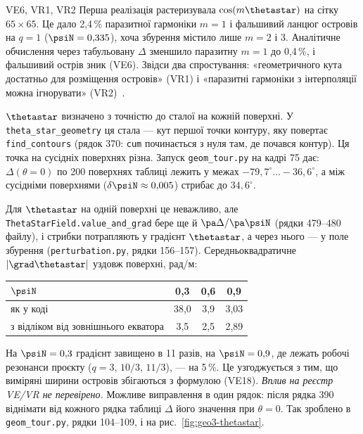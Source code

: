 \begin{established}{VE6, VR1, VR2}
Перша реалізація растеризувала $\cos(m\thetastar)$ на сітку $65\times65$. Це дало 2,4\,\% паразитної гармоніки $m=1$ і фальшивий ланцюг островів на $q=1$ ($\psiN=0{,}335$), хоча збурення містило лише $m=2$ і $3$. Аналітичне обчислення через табульовану $\Delta$ зменшило паразитну $m=1$ до 0,4\,\%, і фальшивий острів зник (VE6). Звідси два спростування: «геометричного кута достатньо для розміщення островів» (VR1) і «паразитні гармоніки з інтерполяції можна ігнорувати» (VR2)~\cite{RegViz}.
\end{established}

\begin{newfinding}
$\thetastar$ визначено з точністю до сталої на кожній поверхні. У \texttt{theta\_star\_geometry} ця стала --- кут першої точки контуру, яку повертає \texttt{find\_contours} (рядок 370: \texttt{cum} починається з нуля там, де почався контур). Ця точка на сусідніх поверхнях різна. Запуск \texttt{geom\_tour.py} на кадрі 75 дає: $\Delta(\theta=0)$ по 200 поверхнях таблиці лежить у межах $-79{,}7^\circ\ldots-36{,}6^\circ$, а між сусідніми поверхнями ($\delta\psiN\approx0{,}005$) стрибає до $34{,}6^\circ$.

Для $\thetastar$ на одній поверхні це неважливо, але \texttt{ThetaStarField.value\_and\_grad} бере ще й $\pa\Delta/\pa\psiN$ (рядки 479--480 файлу), і стрибки потрапляють у градієнт $\thetastar$, а через нього --- у поле збурення (\texttt{perturbation.py}, рядки 156--157). Середньоквадратичне $|\grad\thetastar|$ уздовж поверхні, рад/м:
\begin{center}\small
\begin{tabular}{@{}lccc@{}}\toprule
$\psiN$ & 0,3 & 0,6 & 0,9\\\midrule
як у коді & 38,0 & 3,9 & 3,03\\
з відліком від зовнішнього екватора & 3,5 & 2,5 & 2,89\\\bottomrule
\end{tabular}
\end{center}
На $\psiN=0{,}3$ градієнт завищено в 11 разів, на $\psiN=0{,}9$, де лежать робочі резонанси проєкту ($q=3$, $10/3$, $11/3$), --- на 5\,\%. Це узгоджується з тим, що виміряні ширини островів збігаються з формулою (VE18). \emph{Вплив на реєстр VE/VR не перевірено.} Можливе виправлення в один рядок: після рядка 390 віднімати від кожного рядка таблиці $\Delta$ його значення при $\theta=0$. Так зроблено в \texttt{geom\_tour.py}, рядки 104--109, і на рис.~\ref{fig:geo3-thetastar}.
\end{newfinding}


